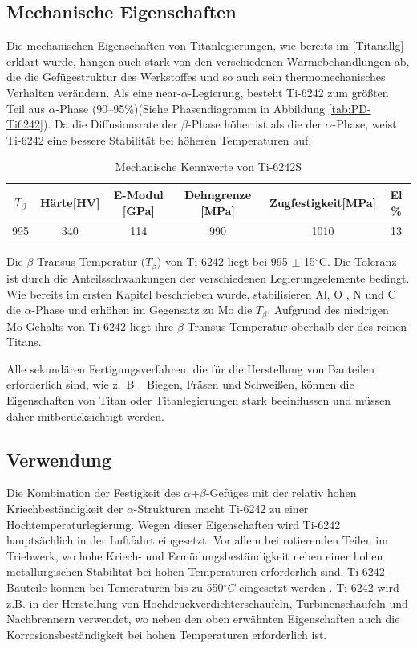 \subsection{Mechanische Eigenschaften}

Die mechanischen Eigenschaften von Titanlegierungen, wie bereits im \ref{Titanallg} erklärt wurde, hängen auch stark von den verschiedenen Wärmebehandlungen ab, die die Gefügestruktur des Werkstoffes und so auch sein thermomechanisches Verhalten verändern.
Als eine near-$\alpha$-Legierung, besteht Ti-6242 zum größten Teil aus $\alpha$-Phase (90--95\%)(Siehe Phasendiagramm in Abbildung \ref{tab:PD-Ti6242}). Da die Diffusionsrate der $\beta$-Phase höher ist als die der $\alpha$-Phase, weist Ti-6242 eine bessere Stabilität bei höheren Temperaturen auf. \cite{Prasad.2017} 

\begin{table}[h]
	\centering	
	\begin{tabular}{|c| c| c| c| c| c|}										
		\hline
		$T_{\beta}$ & Härte[HV] & E-Modul [GPa]& Dehngrenze [MPa]&Zugfestigkeit[MPa]& El \% \\
		\hline
		995&340&114&990&1010&13\\
		\hline
	\end{tabular}
	\caption{Mechanische Kennwerte von Ti-6242S \cite{C.Leyens.2005}}
	\label{Mec.}
\end{table}

Die $\beta$-Transus-Temperatur ($T_{\beta}$) von Ti-6242 liegt bei 995 $\pm$ 15$^\circ$C. Die Toleranz ist durch die Anteilsschwankungen der verschiedenen Legierungselemente bedingt. Wie bereits im ersten Kapitel beschrieben wurde, stabilisieren  Al, O , N und C die $\alpha$-Phase und erhöhen im Gegensatz zu Mo die $T_{\beta}$.
Aufgrund des niedrigen Mo-Gehalts von Ti-6242 liegt ihre $\beta$-Transus-Temperatur oberhalb der des reinen Titans.

Alle sekundären Fertigungsverfahren, die für die Herstellung von Bauteilen erforderlich sind, wie z.~B.~ Biegen, Fräsen und Schweißen, können die  Eigenschaften von Titan oder Titanlegierungen stark beeinflussen und müssen daher mitberücksichtigt werden.


\subsection{Verwendung}


Die Kombination der Festigkeit des $\alpha$+$\beta$-Gefüges mit der relativ hohen Kriechbeständigkeit der $\alpha$-Strukturen macht Ti-6242 zu einer Hochtemperaturlegierung. 
Wegen dieser Eigenschaften wird Ti-6242 hauptsächlich in der Luftfahrt eingesetzt. Vor allem bei rotierenden Teilen im Triebwerk, wo hohe Kriech- und Ermüdungsbeständigkeit neben einer hohen metallurgischen Stabilität bei hohen Temperaturen erforderlich sind. 
Ti-6242-Bauteile können bei Temeraturen bis zu 550$^\circ C$ eingesetzt werden \cite{C.Leyens.2005}.
Ti-6242 wird z.B. in der Herstellung von Hochdruckverdichterschaufeln, Turbinenschaufeln und Nachbrennern verwendet, wo neben den oben erwähnten Eigenschaften auch die Korrosionsbeständigkeit bei hohen Temperaturen erforderlich ist. 
\pagebreak

